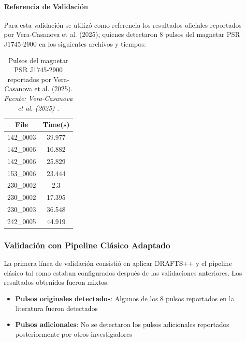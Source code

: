 \paragraph{Referencia de Validación}

Para esta validación se utilizó como referencia los resultados oficiales reportados por Vera-Casanova et al. (2025), quienes detectaron 8 pulsos del magnetar PSR J1745-2900 en los siguientes archivos y tiempos:

\begin{table}[H]
    \centering
    \caption{Pulsos del magnetar PSR J1745-2900 reportados por Vera-Casanova et al. (2025). \textit{Fuente: Vera-Casanova et al. (2025) \cite{veracasanova2025}.}}
    \label{tab:veracasanova_reference}
    \begin{tabular}{|c|c|}
        \hline
        \textbf{File} & \textbf{Time(s)} \\
        \hline
        142\_0003 & 39.977 \\
        142\_0006 & 10.882 \\
        142\_0006 & 25.829 \\
        153\_0006 & 23.444 \\
        230\_0002 & 2.3 \\
        230\_0002 & 17.395 \\
        230\_0003 & 36.548 \\
        242\_0005 & 44.919 \\
        \hline
    \end{tabular}
\end{table}

\subsubsection{Validación con Pipeline Clásico Adaptado}

La primera línea de validación consistió en aplicar DRAFTS++ y el pipeline clásico tal como estaban configurados después de las validaciones anteriores. Los resultados obtenidos fueron mixtos:

\begin{itemize}
    \item \textbf{Pulsos originales detectados}: Algunos de los 8 pulsos reportados en la literatura fueron detectados
    \item \textbf{Pulsos adicionales}: No se detectaron los pulsos adicionales reportados posteriormente por otros investigadores
\end{itemize}

